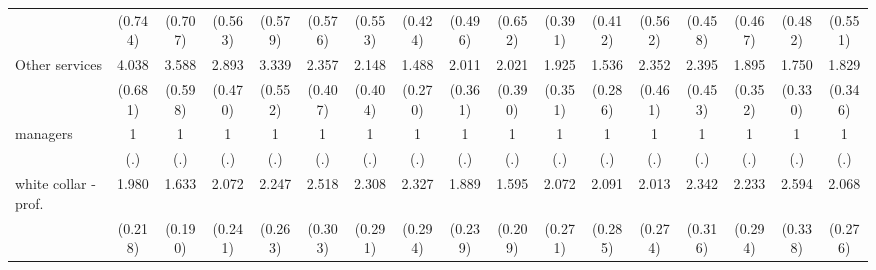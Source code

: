 {\begin{tabular}{l*{16}{c}}
                    &     (0.744)         &     (0.707)         &     (0.563)         &     (0.579)         &     (0.576)         &     (0.553)         &     (0.424)         &     (0.496)         &     (0.652)         &     (0.391)         &     (0.412)         &     (0.562)         &     (0.458)         &     (0.467)         &     (0.482)         &     (0.551)         \\
[1em]
Other services      &       4.038\sym{***}&       3.588\sym{***}&       2.893\sym{***}&       3.339\sym{***}&       2.357\sym{***}&       2.148\sym{***}&       1.488\sym{*}  &       2.011\sym{***}&       2.021\sym{***}&       1.925\sym{***}&       1.536\sym{*}  &       2.352\sym{***}&       2.395\sym{***}&       1.895\sym{***}&       1.750\sym{**} &       1.829\sym{**} \\
                    &     (0.681)         &     (0.598)         &     (0.470)         &     (0.552)         &     (0.407)         &     (0.404)         &     (0.270)         &     (0.361)         &     (0.390)         &     (0.351)         &     (0.286)         &     (0.461)         &     (0.453)         &     (0.352)         &     (0.330)         &     (0.346)         \\
[1em]
managers            &           1         &           1         &           1         &           1         &           1         &           1         &           1         &           1         &           1         &           1         &           1         &           1         &           1         &           1         &           1         &           1         \\
                    &         (.)         &         (.)         &         (.)         &         (.)         &         (.)         &         (.)         &         (.)         &         (.)         &         (.)         &         (.)         &         (.)         &         (.)         &         (.)         &         (.)         &         (.)         &         (.)         \\
[1em]
white collar - prof.&       1.980\sym{***}&       1.633\sym{***}&       2.072\sym{***}&       2.247\sym{***}&       2.518\sym{***}&       2.308\sym{***}&       2.327\sym{***}&       1.889\sym{***}&       1.595\sym{***}&       2.072\sym{***}&       2.091\sym{***}&       2.013\sym{***}&       2.342\sym{***}&       2.233\sym{***}&       2.594\sym{***}&       2.068\sym{***}\\
                    &     (0.218)         &     (0.190)         &     (0.241)         &     (0.263)         &     (0.303)         &     (0.291)         &     (0.294)         &     (0.239)         &     (0.209)         &     (0.271)         &     (0.285)         &     (0.274)         &     (0.316)         &     (0.294)         &     (0.338)         &     (0.276)         \\

\end{tabular}}
